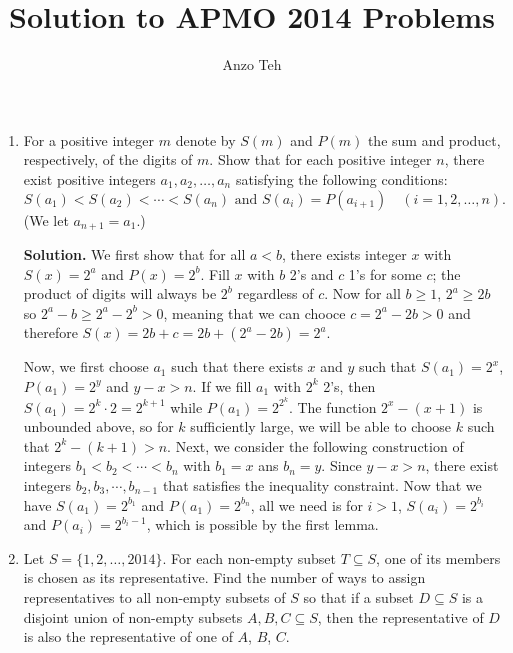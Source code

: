 \documentclass[11pt,a4paper]{article}
\begin{document}
\newcommand{\la}{\leftarrow}
\newcommand{\lra}{\leftrightarrow}
\newcommand{\bbN}{\mathbb{N}}
\newcommand{\bbZ}{\mathbb{Z}}
\newcommand{\dsum}{\displaystyle\sum}
\newcommand{\dprod}{\displaystyle\prod}


\title{Solution to APMO 2014 Problems}
\author{Anzo Teh}
\date{}
\maketitle

\begin{enumerate}
	\item For a positive integer $m$ denote by $S(m)$ and $P(m)$ the sum and product, respectively, of the digits of $m$. Show that for each positive integer $n$, there exist positive integers $a_1, a_2, \ldots, a_n$ satisfying the following conditions: \[ S(a_1) < S(a_2) < \cdots < S(a_n) \text{ and } S(a_i) = P(a_{i+1}) \quad (i=1,2,\ldots,n). \](We let $a_{n+1} = a_1$.)
	
	\textbf{Solution.} We first show that for all $a<b$, there exists integer $x$ with $S(x)=2^a$ and $P(x)=2^b$. Fill $x$ with $b$ 2's and $c$ 1's for some $c$; the product of digits will always be $2^b$ regardless of $c$. Now for all $b\ge 1$, $2^a\ge 2b$ so $2^a-b\ge 2^a-2^b>0$, meaning that we can chooce $c=2^a-2b>0$ and therefore $S(x)=2b+c=2b+(2^a-2b)=2^a$. 
	
	Now, we first choose $a_1$ such that there exists $x$ and $y$ such that $S(a_1)=2^x$, $P(a_1)=2^y$ and $y - x > n$. If we fill $a_1$ with $2^k$ 2's, then $S(a_1)=2^k\cdot 2 = 2^{k+1}$ while $P(a_1)=2^{2^k}$. The function $2^x-(x+1)$ is unbounded above, so for $k$ sufficiently large, we will be able to choose $k$ such that $2^k-(k+1)>n$. 
	Next, we consider the following construction of integers $b_1<b_2<\cdots < b_n$ with $b_1=x$ ans $b_n=y$. Since $y-x>n$, there exist integers $b_2, b_3, \cdots, b_{n-1}$ that satisfies the inequality constraint. Now that we have $S(a_1)=2^{b_1}$ and $P(a_1)=2^{b_n}$, all we need is for $i>1$, $S(a_i)=2^{b_i}$ and $P(a_i)=2^{b_i-1}$, which is possible by the first lemma. 
	
	\item Let $S = \{1,2,\dots,2014\}$. For each non-empty subset $T \subseteq S$, one of its members is chosen as its representative. Find the number of ways to assign representatives to all non-empty subsets of $S$ so that if a subset $D \subseteq S$ is a disjoint union of non-empty subsets $A, B, C \subseteq S$, then the representative of $D$ is also the representative of one of $A$, $B$, $C$.
	

\end{enumerate}
\end{document}
